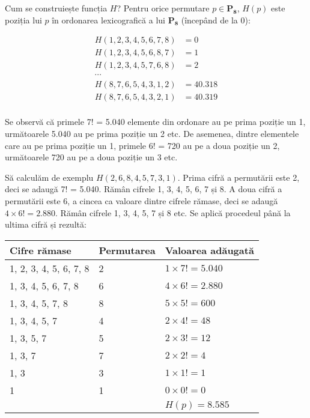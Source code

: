Cum se construiește funcția $H$? Pentru orice permutare $p \in \mathbf{P_8}$,
$H(p)$ este poziția lui $p$ în ordonarea lexicografică a lui $\mathbf{P_8}$
(începând de la 0):

\begin{align*}
H(1, 2, 3, 4, 5, 6, 7, 8) & = 0 \\
H(1, 2, 3, 4, 5, 6, 8, 7) & = 1 \\
H(1, 2, 3, 4, 5, 7, 6, 8) & = 2 \\
\cdots \\
H(8, 7, 6, 5, 4, 3, 1, 2) & = 40.318 \\
H(8, 7, 6, 5, 4, 3, 2, 1) & = 40.319 \\
\end{align*}

Se observă că primele 7! = 5.040 elemente din ordonare au pe prima poziție un
1, următoarele 5.040 au pe prima poziție un 2 etc. De asemenea, dintre
elementele care au pe prima poziție un 1, primele 6! = 720 au pe a doua
poziție un 2, următoarele 720 au pe a doua poziție un 3 etc.

Să calculăm de exemplu $H(2, 6, 8, 4, 5, 7, 3, 1)$. Prima cifră a permutării
este 2, deci se adaugă 7! = 5.040. Rămân cifrele 1, 3, 4, 5, 6, 7 și 8. A doua
cifră a permutării este 6, a cincea ca valoare dintre cifrele rămase, deci se
adaugă $4 \times 6! = 2.880$. Rămân cifrele 1, 3, 4, 5, 7 și 8 etc. Se aplică
procedeul până la ultima cifră și rezultă:

\begin{tabular}{|l|l|l|}
  \hline
  Cifre rămase           & Permutarea & Valoarea adăugată \\ \hline
  1, 2, 3, 4, 5, 6, 7, 8 & 2          & $1 \times 7! = 5.040$ \\
  1, 3, 4, 5, 6, 7, 8    & 6          & $4 \times 6! = 2.880$ \\
  1, 3, 4, 5, 7, 8       & 8          & $5 \times 5! = 600$ \\
  1, 3, 4, 5, 7          & 4          & $2 \times 4! = 48$ \\
  1, 3, 5, 7             & 5          & $2 \times 3! = 12$ \\
  1, 3, 7                & 7          & $2 \times 2! = 4$ \\
  1, 3                   & 3          & $1 \times 1! = 1$ \\
  1                      & 1          & $0 \times 0! = 0$ \\ \hline
                         &            & $H(p) = 8.585 $\\ \hline
\end{tabular}

